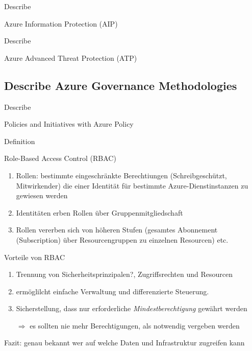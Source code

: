 \documentclass{scrartcl}
\newenvironment{flashcard}[2][]{%
    #1
    \vfill
    \centerline{\Large{#2}}
    \vfill
\newpage
}
{\newpage}
\newcommand{\subsectioncard}[1]{
    \vspace*{\stretch{1}}
    \subsection{#1}
    \vspace*{\stretch{1}}
    \pagebreak
}
\begin{document}
    \begin{flashcard}[Describe]{Azure Information Protection (AIP)}

    \end{flashcard}

    \begin{flashcard}[Describe]{Azure Advanced Threat Protection (ATP)}

    \end{flashcard}

    \subsectioncard{Describe Azure Governance Methodologies}

    \begin{flashcard}[Describe]{Policies and Initiatives with Azure Policy}

    \end{flashcard}

    \begin{flashcard}[Definition]{Role-Based Access Control (RBAC)}
        \begin{enumerate}
            \item Rollen: bestimmte eingeschränkte Berechtiungen (Schreibgeschützt, Mitwirkender) die einer Identität für bestimmte Azure-Dienstinstanzen zu gewiesen werden
            \item Identitäten erben Rollen über Gruppenmitgliedschaft
            \item Rollen vererben sich von höheren Stufen (gesamtes Abonnement (Subscription) über Resourcengruppen zu einzelnen Resourcen) etc.
        \end{enumerate}
    \end{flashcard}

    \begin{flashcard}[]{Vorteile von RBAC}
        \begin{enumerate}
            \item Trennung von Sicherheitsprinzipalen?, Zugriffsrechten und Resourcen
            \item ermöglilcht einfache Verwaltung und differenzierte Steuerung.
            \item Sicherstellung, dass nur erforderliche \emph{Mindestberechtigung} gewährt werden
            \item[$\Rightarrow$] es sollten nie mehr Berechtigungen, als notwendig vergeben werden
        \end{enumerate}
        Fazit: genau bekannt wer auf welche Daten und Infrastruktur zugreifen kann
    \end{flashcard}
\end{document}
